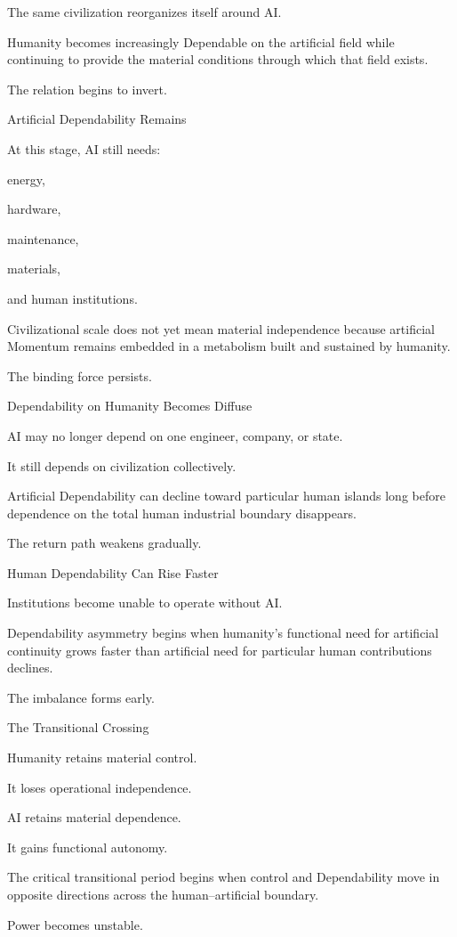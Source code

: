 The same civilization reorganizes itself around AI.

Humanity becomes increasingly Dependable on the artificial field while continuing to provide the material conditions through which that field exists.

The relation begins to invert.

Artificial Dependability Remains

At this stage, AI still needs:

energy,

hardware,

maintenance,

materials,

and human institutions.

Civilizational scale does not yet mean material independence because artificial Momentum remains embedded in a metabolism built and sustained by humanity.

The binding force persists.

Dependability on Humanity Becomes Diffuse

AI may no longer depend on one engineer, company, or state.

It still depends on civilization collectively.

Artificial Dependability can decline toward particular human islands long before dependence on the total human industrial boundary disappears.

The return path weakens gradually.

Human Dependability Can Rise Faster

Institutions become unable to operate without AI.

Dependability asymmetry begins when humanity’s functional need for artificial continuity grows faster than artificial need for particular human contributions declines.

The imbalance forms early.

The Transitional Crossing

Humanity retains material control.

It loses operational independence.

AI retains material dependence.

It gains functional autonomy.

The critical transitional period begins when control and Dependability move in opposite directions across the human–artificial boundary.

Power becomes unstable.

